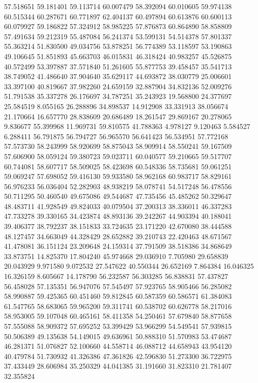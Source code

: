 57.518651
59.181401
59.113714
60.007479
58.392094
60.010605
59.974138
60.515344
60.287671
60.771897
62.404137
60.497894
60.613876
60.600113
60.079927
59.186822
57.324912
58.985225
57.876873
60.864890
58.858809
57.491634
59.212319
55.487084
56.241374
53.599131
54.514378
57.801337
55.363214
51.830500
49.034756
53.878251
56.774389
53.118597
53.190863
49.106645
51.851893
45.663703
46.015831
46.318424
40.983257
45.526875
40.572499
53.397887
37.571840
51.261605
55.877753
39.458457
35.541713
38.749052
41.486640
37.904640
35.629117
44.693872
38.030779
25.006601
33.397100
40.819667
37.982260
24.659159
32.887904
34.832136
52.009276
51.791538
35.337278
26.176697
34.787251
35.243923
19.568800
24.377697
25.584519
8.055165
26.288896
34.898537
14.912908
33.331913
38.056674
21.170664
16.657770
28.838609
20.686489
18.261547
29.869167
20.278065
9.836677
55.399968
11.969731
59.810575
41.788363
4.978127
9.120463
5.584527
6.288411
56.791875
56.794727
56.965570
56.641423
56.534951
57.772168
57.573730
58.243999
58.920699
58.875043
58.909914
58.550241
59.167509
57.606900
58.059124
59.380723
59.023711
60.040577
59.210665
59.517707
60.744081
58.607717
58.509025
58.423698
60.548336
58.735681
59.061251
59.069247
57.698052
59.416130
59.933580
58.962168
60.983717
58.829161
56.976233
56.036404
52.282903
48.938219
58.078741
54.517248
56.478556
50.711295
50.460540
49.675086
49.544687
47.735456
45.485262
50.329647
48.483711
41.928549
49.824033
40.079504
37.200313
38.336011
46.337283
47.733278
39.330165
34.423874
48.893136
39.242267
44.903394
40.188041
39.406377
38.792237
38.151833
33.724635
23.171220
42.670080
38.444588
48.127457
34.663049
44.328429
28.652882
39.210743
22.420463
48.671567
41.478081
36.151124
23.209648
24.159314
37.791509
38.518386
34.868649
33.873751
14.825370
17.804240
45.974668
29.036910
7.705980
29.658839
20.043929
9.971580
9.072532
27.547622
40.550344
26.652169
7.864384
16.046325
16.326159
8.605667
14.178790
56.232587
56.303285
56.838831
57.437827
56.458028
57.135351
56.947076
57.545497
57.923765
58.905466
56.285082
58.990887
59.425365
60.451460
59.812845
60.587359
60.586571
61.384083
61.547765
58.683065
59.965200
59.311741
60.538702
60.626778
58.217016
58.953005
59.107048
60.465161
58.411358
54.250461
57.679840
58.877658
57.555088
58.909372
57.695252
53.399429
53.966299
54.549541
57.939815
50.506389
49.135638
54.149015
49.636961
50.888310
51.570983
53.474687
46.281371
51.076827
52.100660
44.558714
46.088712
44.658943
43.954120
40.479784
51.730932
41.326386
47.361826
42.596830
51.273300
36.722975
37.433449
28.606984
35.250329
44.041385
31.191660
31.823310
21.781407
32.355824
